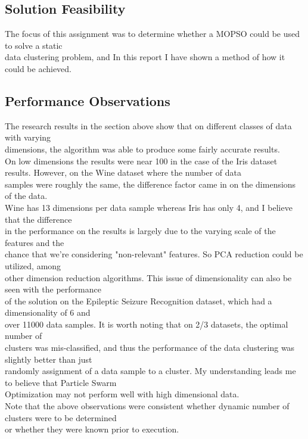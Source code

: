 \begin{flushleft}
    \subsection{Solution Feasibility}
        The focus of this assignment was to determine whether a MOPSO could be used to solve a static \\
        data clustering problem, and In this report I have shown a method of how it could be achieved. \\
    \subsection{Performance Observations}
        The research results in the section above show that on different classes of data with varying \\
        dimensions, the algorithm was able to produce some fairly accurate results.\\
        On low dimensions the results were near 100%
        in the case of the Iris dataset results. However, on the Wine dataset where the number of data \\
        samples were roughly the same, the difference factor came in on the dimensions of the data. \\
        Wine has 13 dimensions per data sample whereas Iris has only 4, and I believe that the difference \\
        in the performance on the results is largely due to the varying scale of the features and the \\
        chance that we're considering "non-relevant" features. So PCA reduction could be utilized, among \\
        other dimension reduction algorithms. This issue of dimensionality can also be seen with the performance \\
        of the solution on the Epileptic Seizure Recognition dataset, which had a dimensionality of 6 and \\
        over 11000 data samples. It is worth noting that on 2/3 datasets, the optimal number of \\
        clusters was mis-classified, and thus the performance of the data clustering was slightly better than just \\
        randomly assignment of a data sample to a cluster. My understanding leads me to believe that Particle Swarm \\
        Optimization may not perform well with high dimensional data. \\
        Note that the above observations were consistent whether dynamic number of clusters were to be determined \\
        or whether they were known prior to execution. \\

\end{flushleft}
